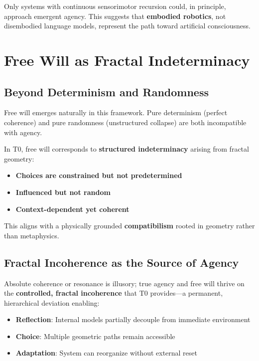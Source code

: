 	Only systems with continuous sensorimotor recursion could, in principle, approach emergent agency. This suggests that \textbf{embodied robotics}, not disembodied language models, represent the path toward artificial consciousness.
	
	\section{Free Will as Fractal Indeterminacy}
	
	\subsection{Beyond Determinism and Randomness}
	
	Free will emerges naturally in this framework. Pure determinism (perfect coherence) and pure randomness (unstructured collapse) are both incompatible with agency.
	
	In T0, free will corresponds to \textbf{structured indeterminacy} arising from fractal geometry:
	
	\begin{itemize}
		\item \textbf{Choices are constrained but not predetermined}
		\item \textbf{Influenced but not random}
		\item \textbf{Context-dependent yet coherent}
	\end{itemize}
	
	This aligns with a physically grounded \textbf{compatibilism} rooted in geometry rather than metaphysics.
	
	\subsection{Fractal Incoherence as the Source of Agency}
	
	Absolute coherence or resonance is illusory; true agency and free will thrive on the \textbf{controlled, fractal incoherence} that T0 provides—a permanent, hierarchical deviation enabling:
	
	\begin{itemize}
		\item \textbf{Reflection}: Internal models partially decouple from immediate environment
		\item \textbf{Choice}: Multiple geometric paths remain accessible
		\item \textbf{Adaptation}: System can reorganize without external reset
	\end{itemize}
	

